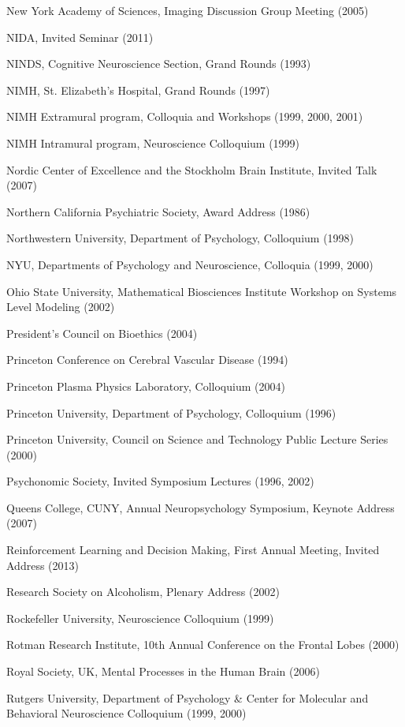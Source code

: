 \documentclass[10 pt]{article}
\begin{document}
New York Academy of Sciences, Imaging Discussion Group Meeting (2005)

NIDA, Invited Seminar (2011)

NINDS, Cognitive Neuroscience Section, Grand Rounds (1993)

NIMH, St. Elizabeth's Hospital, Grand Rounds (1997)

NIMH Extramural program, Colloquia and Workshops (1999, 2000, 2001)

NIMH Intramural program, Neuroscience Colloquium (1999)

Nordic Center of Excellence and the Stockholm Brain Institute, Invited Talk (2007)

Northern California Psychiatric Society, Award Address (1986)

Northwestern University, Department of Psychology, Colloquium (1998)

NYU, Departments of Psychology and Neuroscience, Colloquia (1999, 2000)

Ohio State University, Mathematical Biosciences Institute Workshop on Systems Level Modeling (2002)

President’s Council on Bioethics (2004)

Princeton Conference on Cerebral Vascular Disease (1994)

Princeton Plasma Physics Laboratory, Colloquium (2004)

Princeton University, Department of Psychology, Colloquium (1996)

Princeton University, Council on Science and Technology Public Lecture Series (2000)

Psychonomic Society, Invited Symposium Lectures (1996, 2002)

Queens College, CUNY, Annual Neuropsychology Symposium, Keynote Address (2007)

Reinforcement Learning and Decision Making, First Annual Meeting, Invited Address (2013)

Research Society on Alcoholism, Plenary Address (2002)

Rockefeller University, Neuroscience Colloquium (1999)

Rotman Research Institute, 10th Annual Conference on the Frontal Lobes (2000)

Royal Society, UK, Mental Processes in the Human Brain (2006)

Rutgers University, Department of Psychology \& Center for Molecular and Behavioral Neuroscience Colloquium (1999, 2000)
\end{document}

